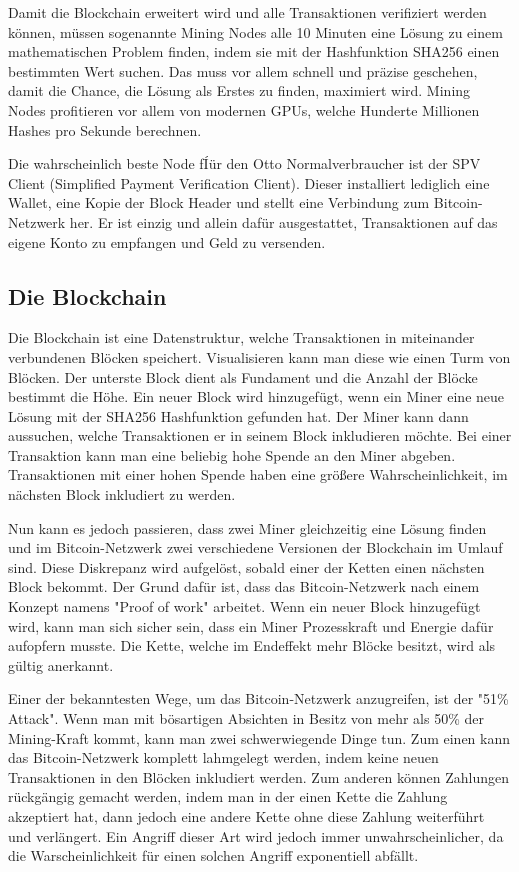 Damit die Blockchain erweitert wird und alle Transaktionen verifiziert werden können, müssen sogenannte Mining Nodes alle 10 Minuten
eine Lösung zu einem mathematischen Problem finden, indem sie mit der Hashfunktion SHA256 einen bestimmten Wert suchen. Das muss
vor allem schnell und präzise geschehen, damit die Chance, die Lösung als Erstes zu finden, maximiert wird. Mining Nodes 
profitieren vor allem von modernen GPUs, welche Hunderte Millionen Hashes pro Sekunde berechnen.

Die wahrscheinlich beste Node fÍür den Otto Normalverbraucher ist der SPV Client (Simplified Payment Verification Client). Dieser
installiert lediglich eine Wallet, eine Kopie der Block Header und stellt eine Verbindung zum Bitcoin-Netzwerk her. Er ist einzig
und allein dafür ausgestattet, Transaktionen auf das eigene Konto zu empfangen und Geld zu versenden. 


\subsection{Die Blockchain}
Die Blockchain ist eine Datenstruktur, welche Transaktionen in miteinander verbundenen Blöcken speichert. Visualisieren kann man
diese wie einen Turm von Blöcken. Der unterste Block dient als Fundament und die Anzahl der Blöcke bestimmt die Höhe. Ein neuer
Block wird hinzugefügt, wenn ein Miner eine neue Lösung mit der SHA256 Hashfunktion gefunden hat. Der Miner kann dann aussuchen,
welche Transaktionen er in seinem Block inkludieren möchte. Bei einer Transaktion kann man eine beliebig hohe Spende an den Miner
abgeben. Transaktionen mit einer hohen Spende haben eine größere Wahrscheinlichkeit, im nächsten Block inkludiert zu werden.

Nun kann es jedoch passieren, dass zwei Miner gleichzeitig eine Lösung finden und im Bitcoin-Netzwerk zwei verschiedene Versionen
der Blockchain im Umlauf sind. Diese Diskrepanz wird aufgelöst, sobald einer der Ketten einen nächsten Block bekommt. Der Grund
dafür ist, dass das Bitcoin-Netzwerk nach einem Konzept namens "Proof of work" arbeitet. Wenn ein neuer Block hinzugefügt wird,
kann man sich sicher sein, dass ein Miner Prozesskraft und Energie dafür aufopfern musste. Die Kette, welche im Endeffekt mehr
Blöcke besitzt, wird als gültig anerkannt.

Einer der bekanntesten Wege, um das Bitcoin-Netzwerk anzugreifen, ist der "51\% Attack". Wenn man mit bösartigen Absichten
in Besitz von mehr als 50\% der Mining-Kraft kommt, kann man zwei schwerwiegende Dinge tun. Zum einen kann das Bitcoin-Netzwerk
komplett lahmgelegt werden, indem keine neuen Transaktionen in den Blöcken inkludiert werden. Zum anderen können Zahlungen
rückgängig gemacht werden, indem man in der einen Kette die Zahlung akzeptiert hat, dann jedoch eine andere Kette ohne diese 
Zahlung weiterführt und verlängert. Ein Angriff dieser Art wird jedoch immer unwahrscheinlicher, da die Warscheinlichkeit für
einen solchen Angriff exponentiell abfällt. 

